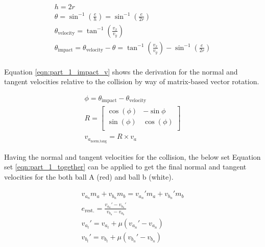 \documentclass[12pt]{article}
\begin{document}
\begin{equation}
    \label{eqn:part_1_thetas}
    \begin{gathered}
        h = 2r \\
        \theta = \sin^{-1} \left(\frac{e}{h}\right) = \sin^{-1} \left(\frac{e}{2r}\right)\\
        \theta_\text{velocity} = \tan^{-1}\left(\frac{v_x}{v_y}\right)\\
        \theta_\text{impact} = \theta_\text{velocity} - \theta =  \tan^{-1}\left(\frac{v_x}{v_y}\right) - \sin^{-1} \left(\frac{e}{2r}\right)\\
    \end{gathered}
\end{equation}

Equation \ref{eqn:part_1_impact_v} shows the derivation for the normal and tangent velocities relative to the collision by way of matrix-based vector rotation.

\begin{equation}
    \label{eqn:part_1_impact_v}
    \begin{gathered}
        \phi = \theta_\text{impact} - \theta_\text{velocity}\\
        R = 
        \left[
        \begin{matrix}
            \cos(\phi) & -\sin{\phi}\\
            \sin(\phi) & \cos(\phi)\\
        \end{matrix}
        \right]\\
        v_{a_\text{norm,tang}} = R \times v_a
    \end{gathered}
\end{equation}

Having the normal and tangent velocities for the collision, the below set Equation set \ref{eqn:part_1_together} can be applied to get the final normal and tangent velocities for the both ball A (red) and ball b (white).

\begin{equation}
    \label{eqn:part_1_together}
    \begin{gathered}
        v_{a_n} m_a + v_{b_n} m_b = v_{a_n}' m_a + v_{b_n}' m_b\\
        e_\text{rest.} = \frac{v_{a_n}' - v_{b_n}'}{v_{b_n} - v_{a_b}}\\
        v_{a_t}' = v_{a_t} + \mu \left(v_{a_n}' - v_{a_n}\right)\\
        v_{b_t}' = v_{b_t} + \mu \left(v_{b_n}' - v_{b_n}\right)
    \end{gathered}
\end{equation}
\end{document}
